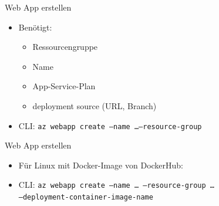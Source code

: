 \begin{flashcard}[Definition]{Web App erstellen}
    \begin{itemize}
        \item Benötigt:
        \begin{itemize}
            \item Ressourcengruppe
            \item Name
            \item App-Service-Plan
            \item deployment source (URL, Branch)
        \end{itemize}
        \item CLI: \texttt{az webapp create --name \ldots --resource-group}
    \end{itemize}
\end{flashcard}



\begin{flashcard}[Definition]{Web App erstellen}
    \begin{itemize}
        \item Für Linux mit Docker-Image von DockerHub:
        \item CLI: \texttt{az webapp create --name \ldots\ --resource-group \ldots\ \\--deployment-container-image-name}
    \end{itemize}
\end{flashcard}


